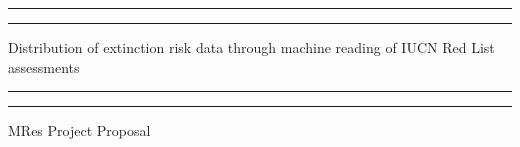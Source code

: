 \documentclass[11pt, a4paper, titlepage]{article}
\begin{document}
\linenumbers
\begin{titlepage} %

    \centering %

    \scshape %

    \vspace*{\baselineskip} %




    \rule{\textwidth}{1.6pt}\vspace*{-\baselineskip}\vspace*{2pt} %

    \rule{\textwidth}{0.4pt} %

    \vspace{0.75\baselineskip} %

    {\LARGE Distribution of extinction risk data through machine reading of IUCN Red List assessments \\} %

    \vspace{0.75\baselineskip} %

    \rule{\textwidth}{0.4pt}\vspace*{-\baselineskip}\vspace{3.2pt} %

    \rule{\textwidth}{1.6pt} %

    \vspace{2\baselineskip} %




    MRes Project Proposal %

    \vspace*{3\baselineskip} %





\end{titlepage}
\end{document}
